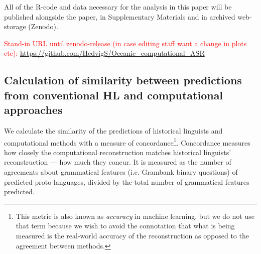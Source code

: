 \documentclass[12pt,letterpaper]{article}
\begin{document}
All of the R-code and data necessary for the analysis in this paper will be published alongside the paper, in Supplementary Materials and in archived web-storage (Zenodo).

\textcolor{red}{Stand-in URL until zenodo-release (in case editing staff want a change in plots etc):}
\url{https://github.com/HedvigS/Oceanic_computational_ASR}

 \FloatBarrier
\subsection{Calculation of similarity between predictions from conventional HL and computational approaches}
\label{result_calc_section}
We calculate the similarity of the predictions of historical linguists and computational methods with a measure of concordance\footnote{This metric is also known as \textit{accuracy} in machine learning, but we do not use that term because we wish to avoid the connotation that what is being measured is the real-world accuracy of the reconstruction as opposed to the agreement between methods.}. Concordance measures how closely the computational reconstruction matches historical linguists' reconstruction --- how much they concur. It is measured as the number of agreements about grammatical features (i.e. Grambank binary questions) of predicted proto-languages, divided by the total number of grammatical features predicted. 

\end{document}
